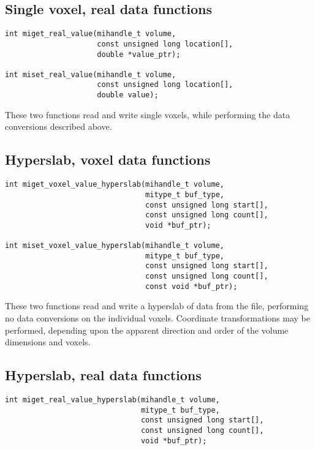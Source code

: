 \documentclass{article}
\begin{document}
\subsection{Single voxel, real data functions}
\begin{verbatim}
int miget_real_value(mihandle_t volume,
                     const unsigned long location[],
                     double *value_ptr);

int miset_real_value(mihandle_t volume,
                     const unsigned long location[],
                     double value);
\end{verbatim}

These two functions read and write single voxels, while performing the data
conversions described above.

\subsection{Hyperslab, voxel data functions}
\begin{verbatim}
int miget_voxel_value_hyperslab(mihandle_t volume,
                                mitype_t buf_type,
                                const unsigned long start[],
                                const unsigned long count[],
                                void *buf_ptr);

int miset_voxel_value_hyperslab(mihandle_t volume, 
                                mitype_t buf_type,
                                const unsigned long start[],
                                const unsigned long count[],
                                const void *buf_ptr);
\end{verbatim}

These two functions read and write a hyperslab of data from the file, 
performing no data conversions on the individual voxels.  Coordinate
transformations may be performed, depending upon the apparent direction
and order of the volume dimensions and voxels.

\subsection{Hyperslab, real data functions}
\begin{verbatim}
int miget_real_value_hyperslab(mihandle_t volume,
                               mitype_t buf_type,
                               const unsigned long start[],
                               const unsigned long count[],
                               void *buf_ptr);
\end{verbatim}
\end{document}

